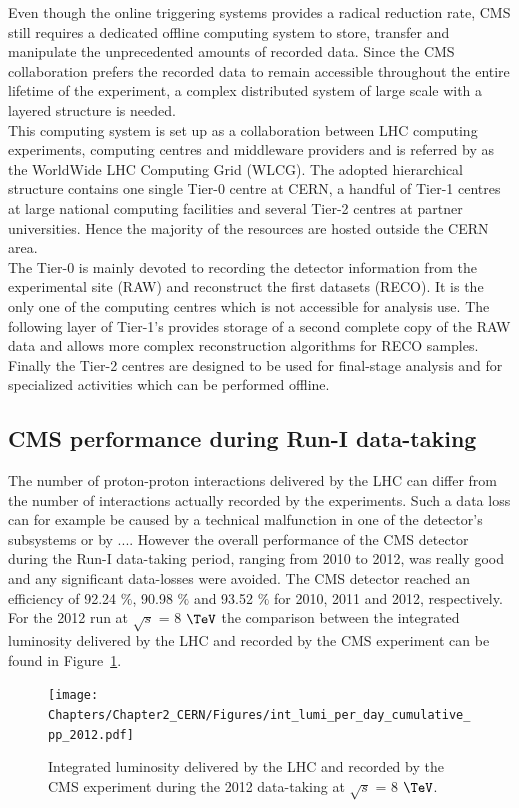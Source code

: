 Even though the online triggering systems provides a radical reduction rate, CMS still requires a dedicated offline computing system to store, transfer and manipulate the unprecedented amounts of recorded data. Since the CMS collaboration prefers the recorded data to remain accessible throughout the entire lifetime of the experiment, a complex distributed system of large scale with a layered structure is needed.
\\
This computing system is set up as a collaboration between LHC computing experiments, computing centres and middleware providers and is referred by as the WorldWide LHC Computing Grid (WLCG). The adopted hierarchical structure contains one single Tier-0 centre at CERN, a handful of Tier-1 centres at large national computing facilities and several Tier-2 centres at partner universities. Hence the majority of the resources are hosted outside the CERN area. 
\\
The Tier-0 is mainly devoted to recording the detector information from the experimental site (RAW) and reconstruct the first datasets (RECO). It is the only one of the computing centres which is not accessible for analysis use. The following layer of Tier-1's provides storage of a second complete copy of the RAW data and allows more complex reconstruction algorithms for RECO samples. Finally the Tier-2 centres are designed to be used for final-stage analysis and for specialized activities which can be performed offline.

\subsection{CMS performance during Run-I data-taking}

The number of proton-proton interactions delivered by the LHC can differ from the number of interactions actually recorded by the experiments. 
Such a data loss can for example be caused by a technical malfunction in one of the detector's subsystems or by .... However the overall performance of the CMS detector during the Run-I data-taking period, ranging from 2010 to 2012, was really good and any significant data-losses were avoided. 
The CMS detector reached an efficiency of 92.24 $\%$, 90.98 $\%$ and 93.52 $\%$ for 2010, 2011 and 2012, respectively. For the 2012 run at $\sqrt{s}$ = 8 $\TeV$ the comparison between the integrated luminosity delivered by the LHC and recorded by the CMS experiment can be found in Figure~\ref{fig::LumiEff}.

\begin{figure}[h!t]
 \centering
 \texttt{[image: Chapters/Chapter2\_CERN/Figures/int\_lumi\_per\_day\_cumulative\_pp\_2012.pdf]}
 \caption{Integrated luminosity delivered by the LHC and recorded by the CMS experiment during the 2012 data-taking at $\sqrt{s}$ = 8 $\TeV$.} \label{fig::LumiEff}
\end{figure}

